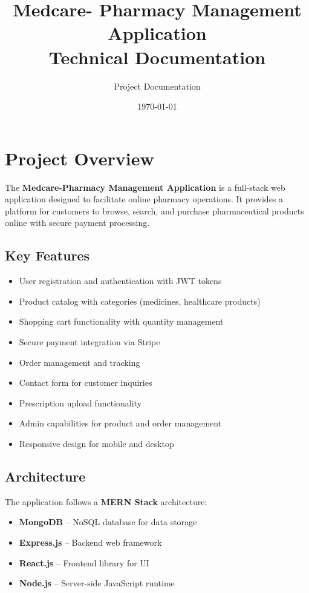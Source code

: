 \documentclass[12pt,a4paper]{article}
\title{\textbf{Medcare-
		Pharmacy Management Application}\\
\large Technical Documentation}
\author{Project Documentation}
\date{\today}
\begin{document}
\maketitle
\tableofcontents
\newpage

\section{Project Overview}

The \textbf{Medcare-Pharmacy Management Application} is a full-stack web application designed to facilitate online pharmacy operations. It provides a platform for customers to browse, search, and purchase pharmaceutical products online with secure payment processing.

\subsection{Key Features}
\begin{itemize}
    \item User registration and authentication with JWT tokens
    \item Product catalog with categories (medicines, healthcare products)
    \item Shopping cart functionality with quantity management
    \item Secure payment integration via Stripe
    \item Order management and tracking
    \item Contact form for customer inquiries
    \item Prescription upload functionality
    \item Admin capabilities for product and order management
    \item Responsive design for mobile and desktop
\end{itemize}

\subsection{Architecture}
The application follows a \textbf{MERN Stack} architecture:
\begin{itemize}
    \item \textbf{MongoDB} -- NoSQL database for data storage
    \item \textbf{Express.js} -- Backend web framework
    \item \textbf{React.js} -- Frontend library for UI
    \item \textbf{Node.js} -- Server-side JavaScript runtime
\end{itemize}
\end{document}
